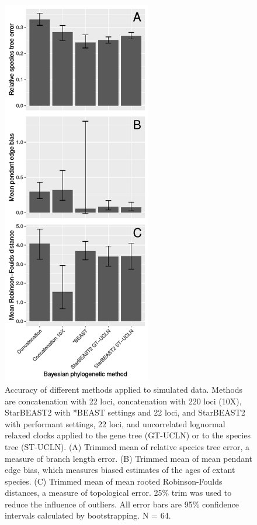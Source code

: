 \documentclass[12pt]{article}
\begin{document}
\begin{figure}[htb!]
\centering
\includegraphics[width=6.5cm]{tree_error.pdf}
\caption
{Accuracy of different methods applied to simulated data. Methods are concatenation with 22 loci, concatenation with 220 loci
(10X), StarBEAST2 with *BEAST settings and 22 loci, and StarBEAST2 with
performant settings, 22 loci, and uncorrelated lognormal relaxed clocks applied
to the gene tree (GT-UCLN) or to the species tree (ST-UCLN). (A) Trimmed mean of
relative species tree error, a measure of branch length error. (B) Trimmed
mean of mean pendant edge bias, which measures biased estimates of the ages of
extant species. (C) Trimmed mean of mean rooted Robinson-Foulds distances, a
measure of topological error. 25\% trim was used to reduce the
influence of outliers. All error bars are 95\% confidence intervals calculated
by bootstrapping. N = 64.}
\label{fig:speciesTreeError}
\end{figure}

\clearpage
\end{document}
